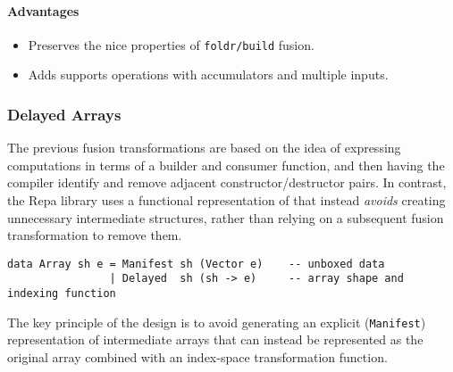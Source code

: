 \paragraph{Advantages}
\begin{itemize}
    \item Preserves the nice properties of \texttt{foldr/build} fusion.
    \item Adds supports operations with accumulators and multiple inputs.
\end{itemize}

%


\subsubsection{Delayed Arrays}

The previous fusion transformations are based on the idea of expressing
computations in terms of a builder and consumer function, and then having the
compiler identify and remove adjacent constructor/destructor pairs. In contrast,
the Repa \cite{Keller:2010} library uses a functional representation of
 that instead \emph{avoids} creating unnecessary
intermediate structures, rather than relying on a subsequent fusion
transformation to remove them.

\begin{lstlisting}[style=Haskell,numbers=none,mathescape,caption={Repa-1 style array definition}]
data Array sh e = Manifest sh (Vector e)    -- unboxed data
                | Delayed  sh (sh -> e)     -- array shape and indexing function
\end{lstlisting}

The key principle of the design is to avoid generating an explicit
(\texttt{Manifest}) representation of intermediate arrays that can instead be
represented as the original array combined with an index-space transformation
function.


